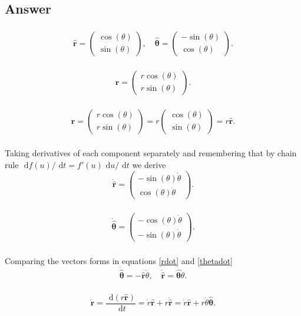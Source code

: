 \documentclass[]{article}
\newcommand{\myvec}[1]{\ensuremath{\begin{pmatrix}#1\end{pmatrix}}}
\newcommand{\bb}{\begin{equation}}
\newcommand{\ee}{\end{equation}}
\newcommand{\rd}{\text{ d}}
\newcommand{\eqns}[2]{equations \eqref{#1} and \eqref{#2}}
\renewcommand{\l}{\left(}
\renewcommand{\r}{\right)}
\begin{document}
\begin{Answ}
\subsection{Answer}
\subsubsection{}
\bb
\hat{\bm{r}}=\myvec{\cos(\theta)\\ \sin(\theta)}, \quad \hat{\bm{\theta}}=\myvec{-\sin(\theta)\\ \cos(\theta)}.
\ee
\subsubsection{}
\bb
\bm{r}=\myvec{r\cos(\theta)\\r\sin(\theta)}.
\ee
\subsubsection{}
\bb
\bm{r}=\myvec{r\cos(\theta)\\r\sin(\theta)}=r\myvec{\cos(\theta)\\\sin(\theta)}=r\hat{\bm{r}}.
\ee
\subsubsection{}
Taking derivatives of each component separately and remembering that by chain rule $\rd f(u)/\rd t=f'(u)\rd u/\rd t$ we derive
\bb
\dot{\hat{\bm{r}}}=\myvec{-\sin(\theta)\dot{\theta}\\\cos(\theta)\dot{\theta}}.\label{rdot}
\ee
\subsubsection{}
\bb
\dot{\hat{\bm{\theta}}}=\myvec{-\cos(\theta)\dot{\theta}\\-\sin(\theta)\dot{\theta}}.\label{thetadot}
\ee
\subsubsection{}
Comparing the vectors forms in \eqns{rdot}{thetadot}
\bb
\dot{\hat{\bm{\theta}}}=-\hat{\bm{r}}\dot{\theta},\quad
\dot{\hat{\bm{r}}}=\hat{\bm{\theta}}\dot{\theta}.
\ee
\subsubsection{}
\bb
\dot{\bm{r}}=\frac{\rd \l r\hat{\bm{r}} \r}{\rd t}=\dot{r}\hat{\bm{r}}+r\dot{\hat{\bm{r}}}=\dot{r}\hat{\bm{r}}+r\dot{\theta}\hat{\bm{\theta}}.
\ee

\end{Answ}
\end{document}
